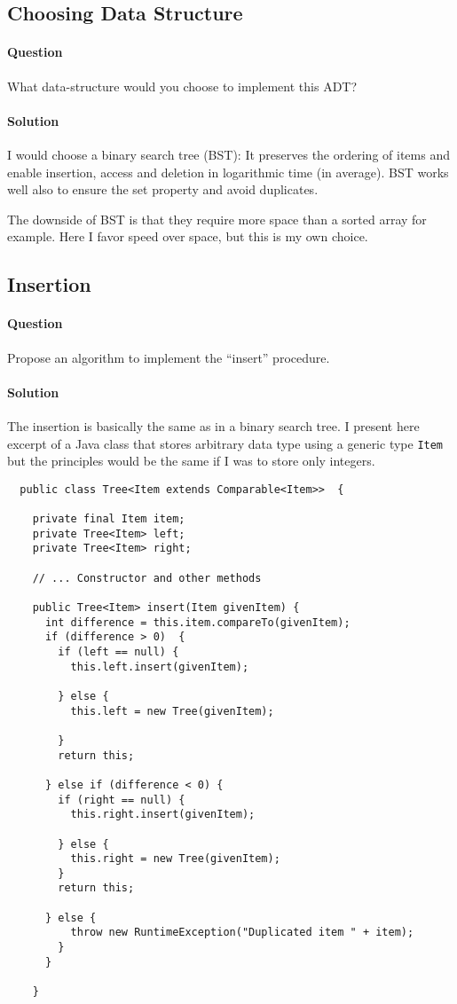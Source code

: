 \documentclass{article}
\begin{document}
\subsection{Choosing Data Structure}
\paragraph{Question} What data-structure would you choose to implement
this ADT?

\paragraph{Solution} I would choose a binary search tree (BST): It
preserves the ordering of items and enable insertion, access and
deletion in logarithmic time (in average). BST works well also to
ensure the set property and avoid duplicates.

The downside of BST is that they require more space than a sorted
array for example. Here I favor speed over space, but this is my own
choice.

\subsection{Insertion}
\paragraph{Question} Propose an algorithm to implement the ``insert''
procedure.

\paragraph{Solution} The insertion is basically the same as in a
binary search tree. I present here excerpt of a Java class that stores
arbitrary data type using a generic type \texttt{Item} but the
principles would be the same if I was to store only integers.

\begin{verbatim}
  public class Tree<Item extends Comparable<Item>>  {
    
    private final Item item;
    private Tree<Item> left;
    private Tree<Item> right;

    // ... Constructor and other methods
    
    public Tree<Item> insert(Item givenItem) {
      int difference = this.item.compareTo(givenItem);
      if (difference > 0)  {
        if (left == null) {
          this.left.insert(givenItem);
          
        } else {
          this.left = new Tree(givenItem);
          
        }
        return this;
        
      } else if (difference < 0) {
        if (right == null) {
          this.right.insert(givenItem);
          
        } else {
          this.right = new Tree(givenItem);
        }
        return this;
        
      } else {
          throw new RuntimeException("Duplicated item " + item);
        }
      }
      
    }
\end{verbatim}
\end{document}
